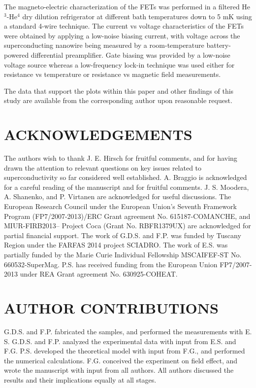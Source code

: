 \documentclass[prl,twocolumn,reprint,graphicx,showpacs,superscriptaddress,floatfix]{revtex4-1}
\begin{document}
The magneto-electric characterization of the FETs was performed in a filtered He$^3$-He$^4$ dry dilution refrigerator at different bath temperatures down to 5 mK using a standard 4-wire technique. The current vs voltage characteristics of the  FETs were obtained by
applying a low-noise biasing current, with voltage across the superconducting nanowire being measured
by a room-temperature battery-powered differential preamplifier. 
Gate biasing was provided by a low-noise voltage source whereas a low-frequency lock-in technique was used either for resistance vs temperature or resistance  vs magnetic field measurements.
 
The data that support the plots within this paper and other findings of this study are available from the corresponding author upon reasonable request.

\section{ACKNOWLEDGEMENTS} 
The authors wish to thank J. E. Hirsch for fruitful comments, and for having drawn the attention to relevant questions on key issues related to superconductivity so far considered well established. 
A. Braggio is acknowledged for a careful reading of the manuscript and for fruitful comments. J. S. Moodera, A. Shanenko, and P. Virtanen are acknowledged  for useful discussions.
The European Research Council under the European Union’s Seventh Framework Program (FP7/2007-2013)/ERC Grant agreement No. 615187-COMANCHE, and MIUR-FIRB2013– Project Coca (Grant No. RBFR1379UX) are acknowledged for partial financial support. 
The work of G.D.S. and F.P. was funded by
Tuscany Region under the FARFAS 2014 project SCIADRO.
The work of E.S.
was partially funded by the Marie Curie Individual Fellowship MSCAIFEF-ST No. 660532-SuperMag.
P.S. has received funding from the European Union FP7/2007-2013 under REA Grant agreement No. 630925-COHEAT.

\section{AUTHOR CONTRIBUTIONS}
G.D.S. and F.P. fabricated the samples, and performed the measurements with E. S. G.D.S. and F.P. analyzed the experimental data with input from E.S. and F.G. 
P.S. developed the theoretical model with input from F.G., and performed the numerical calculations. F.G. conceived the experiment on field effect, and wrote the manuscript with input from all authors. All authors discussed the results and their implications equally at all stages. 
\end{document}
